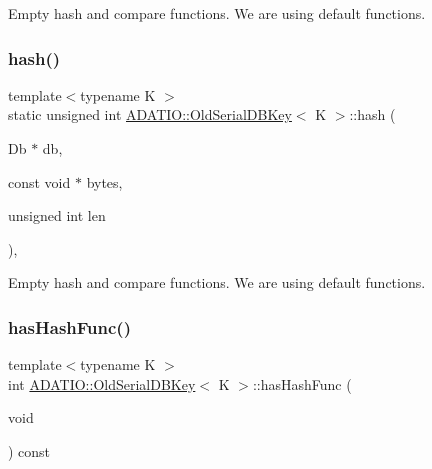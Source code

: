 Empty hash and compare functions. We are using default functions. \mbox{\label{classADATIO_1_1OldSerialDBKey_a35cfd22922a3cd984d6a68cce998565f}} 
\subsubsection{\texorpdfstring{hash()}{hash()}\hspace{0.1cm}{\footnotesize\ttfamily [2/2]}}
{\footnotesize\ttfamily template$<$typename K $>$ \\
static unsigned int \mbox{\hyperlink{classADATIO_1_1OldSerialDBKey}{A\+D\+A\+T\+I\+O\+::\+Old\+Serial\+D\+B\+Key}}$<$ K $>$\+::hash (\begin{DoxyParamCaption}\item[{Db $\ast$}]{db,  }\item[{const void $\ast$}]{bytes,  }\item[{unsigned int}]{len }\end{DoxyParamCaption})\hspace{0.3cm}{\ttfamily [inline]}, {\ttfamily [static]}}

Empty hash and compare functions. We are using default functions. \mbox{\label{classADATIO_1_1OldSerialDBKey_a5cf79bb34ed0e1a471eba03efe9988ad}} 
\subsubsection{\texorpdfstring{hasHashFunc()}{hasHashFunc()}\hspace{0.1cm}{\footnotesize\ttfamily [1/2]}}
{\footnotesize\ttfamily template$<$typename K $>$ \\
int \mbox{\hyperlink{classADATIO_1_1OldSerialDBKey}{A\+D\+A\+T\+I\+O\+::\+Old\+Serial\+D\+B\+Key}}$<$ K $>$\+::has\+Hash\+Func (\begin{DoxyParamCaption}\item[{void}]{ }\end{DoxyParamCaption}) const\hspace{0.3cm}{\ttfamily [inline]}}

